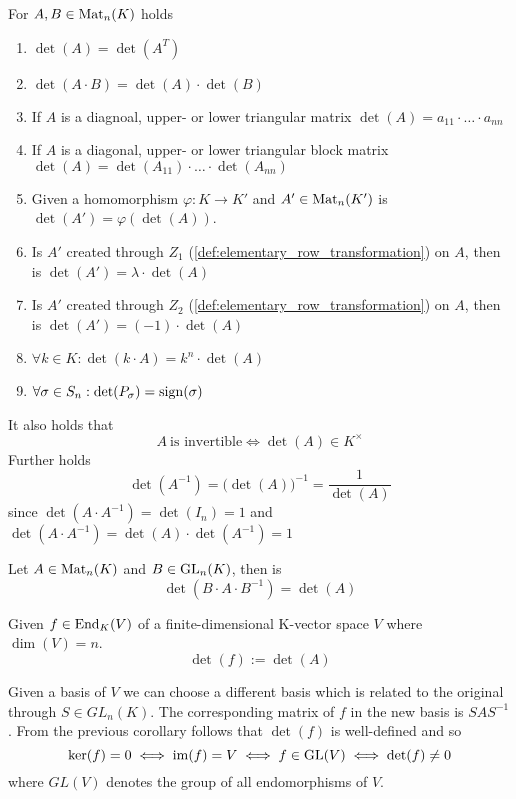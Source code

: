 \begin{proposition}\label{pro:determinant_rules}
   For \(A, B \in \operatorname{Mat}_n(K)\) holds
   \begin{enumerate}[label=\roman*, align=Center]
      \item \(\det(A) = \det(A^T)\)
      \item \(\det(A \cdot B) = \det(A) \cdot \det(B)\)
      \item If \(A\) is a diagnoal, upper- or lower triangular matrix \(\det(A) = a_{11} \cdot \ldots \cdot a_{nn}\)
      \item If \(A\) is a diagonal, upper- or lower triangular block matrix \(\det(A) = \det(A_{11}) \cdot \ldots \cdot \det(A_{nn})\)
      \item Given a homomorphism \(\varphi: K \to K'\) and \(A' \in \operatorname{Mat}_n(K')\) is \(\det(A') = \varphi(\det(A))\).
      \item Is \(A'\) created through \(Z_1\) (\ref{def:elementary_row_transformation}) on \(A\), then is \(\det(A') = \lambda \cdot \det(A)\)
      \item Is \(A'\) created through \(Z_2\) (\ref{def:elementary_row_transformation}) on \(A\), then is \(\det(A') = (-1) \cdot \det(A)\)
      \item \(\forall k \in K: \det(k \cdot A) = k^n \cdot \det(A)\)
      \item \(\forall \sigma \in S_n: \det(P_\sigma) = \operatorname{sign}(\sigma)\)
   \end{enumerate}
\end{proposition}
\begin{remark}
   It also holds that
   \[A~\text{is invertible} \iff \det(A) \in K^\times\]
   Further holds
   \[\det(A^{-1}) = \big(\det(A)\big)^{-1} = \frac{1}{\det(A)}\]
   since \(\det(A \cdot A^{-1}) = \det(I_n) = 1\) and \(\det(A \cdot A^{-1}) = \det(A) \cdot \det(A^{-1}) = 1\)
\end{remark}

\begin{corollary}
   Let \(A \in \operatorname{Mat}_n(K)\) and \(B \in \operatorname{GL}_n(K)\), then is
   \[\det(B \cdot A \cdot B^{-1}) = \det(A)\]
\end{corollary}

\begin{definition}
   Given \(f \in \operatorname{End}_K(V)\) of a finite-dimensional K-vector space \(V\) where \(\dim(V) = n\).
   \[\det(f) := \det(A)\]
\end{definition}
\begin{remark}
   Given a basis of \(V\) we can choose a different basis which is related to the original through \(S \in GL_n(K)\).
   The corresponding matrix of \(f\) in the new basis is \(SAS^{-1}\).
   From the previous corollary follows that \(\det(f)\) is well-defined and so
   \[\ker(f) = 0 \iff \operatorname{im}(f) = V \iff f \in \text{GL}(V) \iff \det(f) \neq 0\]
   where \(GL(V)\) denotes the group of all endomorphisms of \(V\).
\end{remark}

